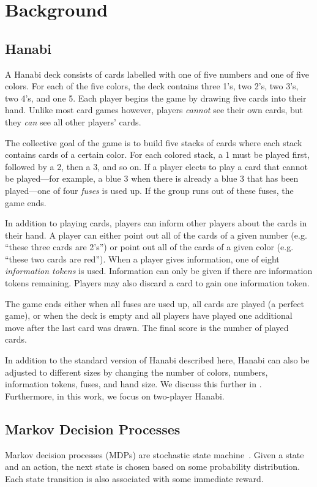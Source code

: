 \section{Background}\label{sec:background}

\subsection{Hanabi}\label{sec:background:hanabi}
A Hanabi deck consists of cards labelled with one of five numbers and one of
five colors. For each of the five colors, the deck contains three 1's, two 2's,
two 3's, two 4's, and one 5.  Each player begins the game by drawing five cards
into their hand. Unlike most card games however, players \emph{cannot} see
their own cards, but they \emph{can} see all other players' cards.

The collective goal of the game is to build five stacks of cards where each
stack contains cards of a certain color. For each colored stack, a 1 must be
played first, followed by a 2, then a 3, and so on. If a player elects to play
a card that cannot be played---for example, a blue 3 when there is already a
blue 3 that has been played---one of four \emph{fuses} is used up. If the group
runs out of these fuses, the game ends.

In addition to playing cards, players can inform other players about the cards
in their hand. A player can either point out all of the cards of a given number
(e.g. ``these three cards are 2's'') or point out all of the cards of a given
color (e.g. ``these two cards are red''). When a player gives information, one
of eight \emph{information tokens} is used. Information can only be given if
there are information tokens remaining. Players may also discard a card to gain
one information token.

The game ends either when all fuses are used up, all cards are played (a
perfect game), or when the deck is empty and all players have played one
additional move after the last card was drawn. The final score is the number of
played cards.

In addition to the standard version of Hanabi described here, Hanabi can also
be adjusted to different sizes by changing the number of colors, numbers,
information tokens, fuses, and hand size. We discuss this further in
.  Furthermore, in this work, we focus on
two-player Hanabi.

\subsection{Markov Decision Processes}\label{sec:background:mdp}
Markov decision processes (MDPs) are stochastic state machine~\cite{mdp}. Given
a state and an action, the next state is chosen based on some probability
distribution. Each state transition is also associated with some immediate
reward.


